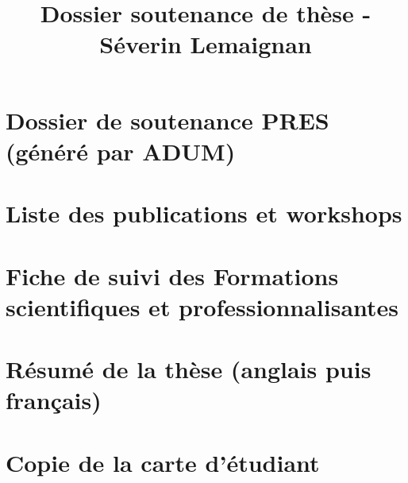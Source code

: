 \documentclass{article}
\title{Dossier soutenance de thèse - Séverin Lemaignan}
\begin{document}
\maketitle

\tableofcontents

\clearpage

\section{Dossier de soutenance PRES (généré par ADUM)}


\section{Liste des publications et workshops}


\section{Fiche de suivi des Formations scientifiques et professionnalisantes}


\section{Résumé de la thèse (anglais puis français)}


%

%

\section{Copie de la carte d'étudiant}

\end{document}
